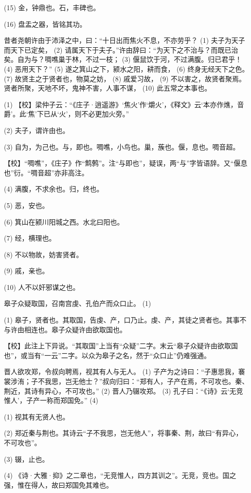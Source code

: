 \documentclass[12pt,UTF8]{ctexbook}
\begin{document}
(15) 金，钟鼎也。石，丰碑也。

(16) 盘盂之器，皆铭其功。

昔者尧朝许由于沛泽之中，曰：“十日出而焦火不息，不亦劳乎？ (1) 夫子为天子而天下已定矣， (2) 请属天下于夫子。”许由辞曰：“为天下之不治与？而既已治矣。自为与？啁噍巢于林，不过一枝； (3) 偃鼠饮于河，不过满腹。归已君乎！ (4) 恶用天下？” (5) 遂之箕山之下，颍水之阳，耕而食， (6) 终身无经天下之色。 (7) 故贤主之于贤者也，物莫之妨， (8) 戚爱习故， (9) 不以害之，故贤者聚焉。贤者所聚，天地不坏，鬼神不害，人事不谋， (10) 此五常之本事也。

(1) 【校】梁仲子云：“《庄子·逍遥游》‘焦火’作‘爝火’，《释文》云‘本亦作燋，音爵’。此‘焦’下已从‘火’，则不必更加火旁。”

(2) 夫子，谓许由也。

(3) 自为，为己也。与，即也。啁噍，小鸟也。巢，蔟也。偃，息也。啁音超。

【校】“啁噍”，《庄子》作“鹪鹩”。注“与即也”，疑误，两“与”字皆语辞。又“偃息也”衍。“啁音超”亦非高注。

(4) 满腹，不求余也。归，终也。

(5) 恶，安也。

(6) 箕山在颍川阳城之西。水北曰阳也。

(7) 经，横理也。

(8) 不以物故，妨害贤者。

(9) 戚，亲也。

(10) 人不以奸邪谋之也。

皋子众疑取国，召南宫虔、孔伯产而众口止。 (1)

(1) 皋子，贤者也。其取国，告虔、产，口乃止。虔、产，其徒之贤者也。其事不与许由相连也。皋子众疑许由欲取国也。

【校】此注上下异说。“其取国”上当有“众疑”二字。末云“皋子众疑许由欲取国也”，或当有“一云”二字。以众为皋子之名，然于“众口止”仍难强通。

晋人欲攻郑，令叔向聘焉，视其有人与无人。 (1) 子产为之诗曰：“子惠思我，褰裳涉洧；子不我思，岂无他士？”叔向归曰：“郑有人，子产在焉，不可攻也。秦、荆近，其诗有异心，不可攻也。” (2) 晋人乃辍攻郑。 (3) 孔子曰：“《诗》云‘无竞惟人’，子产一称而郑国免。” (4)

(1) 视其有无贤人也。

(2) 郑近秦与荆也。其诗云“子不我思，岂无他人”，将事秦、荆，故曰“有异心，不可攻也”。

(3) 辍，止也。

(4) 《诗·大雅·抑》之二章也，“无竞惟人，四方其训之”。无竞，竞也。国之强，惟在得人，故曰郑国免其难也。
\end{document}
